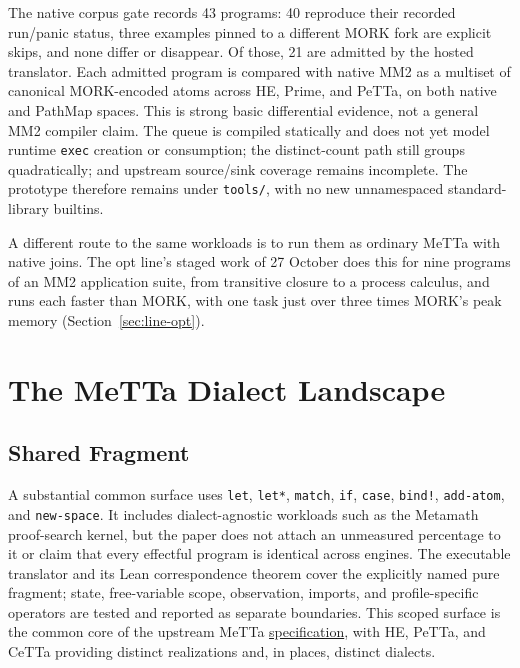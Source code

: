 \documentclass[11pt]{article}
\newcommand{\code}[1]{\texttt{#1}}
\newcommand{\PeTTa}{\textup{PeTTa}}
\newcommand{\HE}{\textup{HE}}
\newcommand{\CeTTa}{\textup{CeTTa}}
\newcommand{\PathMap}{\textup{PathMap}}
\begin{document}
The native corpus gate records 43 programs: 40 reproduce their recorded
run/panic status, three examples pinned to a different MORK fork are explicit
skips, and none differ or disappear.  Of those, 21 are admitted by the hosted
translator.  Each admitted program is compared with native MM2 as a multiset
of canonical MORK-encoded atoms across HE, Prime, and \PeTTa{}, on both native
and \PathMap{} spaces.  This is strong basic differential evidence, not a
general MM2 compiler claim.  The queue is compiled statically and does not
yet model runtime \code{exec} creation or consumption; the distinct-count
path still groups quadratically; and upstream source/sink coverage remains
incomplete.  The prototype therefore remains under \code{tools/}, with no
new unnamespaced standard-library builtins.

A different route to the same workloads is to run them as ordinary MeTTa with
native joins.  The opt line's staged work of 27 October does this for nine
programs of an MM2 application suite, from transitive closure to a process
calculus, and runs each faster than MORK, with one task just over three times
MORK's peak memory (Section~\ref{sec:line-opt}).

\section{The MeTTa Dialect Landscape}

\subsection{Shared Fragment}

A substantial common surface uses \code{let}, \code{let*}, \code{match},
\code{if}, \code{case}, \code{bind!}, \code{add-atom}, and
\code{new-space}.  It includes dialect-agnostic workloads such as the
Metamath proof-search kernel, but the paper does not attach an unmeasured
percentage to it or claim that every effectful program is identical across
engines.  The executable translator and its Lean correspondence theorem
cover the explicitly named pure fragment; state, free-variable scope,
observation, imports, and profile-specific operators are tested and reported
as separate boundaries.  This scoped surface is the common core of the
upstream MeTTa
\href{https://trueagi-io.github.io/hyperon-experimental/metta/}{specification},
with \HE{}, \PeTTa{}, and \CeTTa{} providing distinct realizations and, in
places, distinct dialects.
\end{document}
